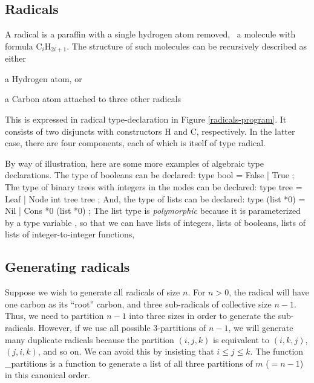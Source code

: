 \subsection{Radicals}

A radical is a paraffin with a single hydrogen atom removed, \ie\ a
molecule with formula C$_i$H$_{2i+1}$.  The structure of such
molecules can be recursively described as either

\begin{tightlist}
 \item a Hydrogen atom, or
 \item a Carbon atom attached to three other radicals
\end{tightlist}

This is expressed in {\cf radical} type-declaration in Figure
\ref{radicals-program}. It consists of two disjuncts with
constructors {\cf H} and {\cf C}, respectively.  In the latter case,
there are four components, each of which is itself of type {\cf
radical}.

By way of illustration, here are some more examples of algebraic type
declarations.  The type of booleans can be declared:
\beginid
type bool = False | True ;
\endid
The type of binary trees with integers in the nodes can be declared:
\beginid
type tree = Leaf | Node int tree tree ;
\endid
And, the type of lists can be declared:
\beginid
type (list *0) = Nil | Cons *0 (list *0) ;
\endid
The list type is {\em polymorphic\/} because it is parameterized by a
type variable {}, so that we can have lists of integers, lists
of booleans, lists of lists of integer-to-integer functions, \etc\

\subsection{Generating radicals}

Suppose we wish to generate all radicals of size $n$.  For $n > 0$,
the radical will have one carbon as its ``root'' carbon, and three
sub-radicals of collective size $n-1$.  Thus, we need to partition
$n-1$ into three sizes in order to generate the sub-radicals.
However, if we use all possible 3-partitions of $n-1$, we will
generate many duplicate radicals because the partition $(i,j,k)$ is
equivalent to $(i,k,j)$, $(j,i,k)$, and so on.  We can avoid this by
insisting that $i \leq j \leq k$.  The function {\_partitions} is
a function to generate a list of all three partitions of $m$ ($= n-1$)
in this canonical order.

